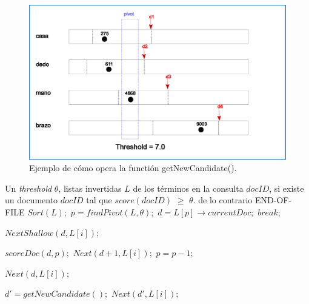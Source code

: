 \begin{figure}[tp]
\centering
\includegraphics[scale=.75]{images/get_new_candidate.eps}
\caption{Ejemplo de cómo opera la functión getNewCandidate().}
\label{fig:getNewCandidate}
\end{figure}

\begin{algorithm}[tp]
\caption{\em $BMW(\theta, L, docID): Block Max Wand$}
\label{alg:bmw}
\begin{algorithmic}[1]
\REQUIRE Un \textit{threshold} $\theta$, listas invertidas $L$ de los términos en la consulta
\ENSURE $docID$, si existe un documento $docID$ tal que $score(docID)$ $\geq$ $\theta$. de lo contrario END-OF-FILE
	\STATE $Sort(L);$
	\STATE $p = findPivot(L,\theta);$
	\STATE $d = L[p] \rightarrow currentDoc;$
  		\STATE $break;$
	\ENDIF
		
		\STATE $NextShallow(d, L[i]);$
	\ENDFOR
	
			\STATE $scoreDoc(d, p);$
				\STATE $Next(d + 1, L[i]);$
			\ENDFOR
		\ELSE
				\STATE $p = p - 1;$			
			\ENDWHILE
			
				\STATE $Next(d, L[i]);$
			\ENDFOR
			
		\ENDIF		
	\ELSE	
		\STATE $d' = getNewCandidate();$
			\STATE $Next(d', L[i]);$
		\ENDFOR
	\ENDIF
	
\ENDWHILE

\end{algorithmic}
\end{algorithm}